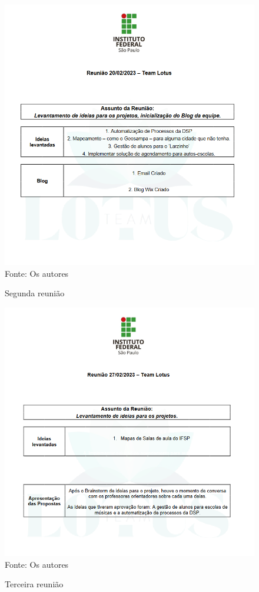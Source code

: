 \documentclass[12pt,a4paper]{article}
\begin{document}
\begin{figure}[H]
    \centering
    \caption{Segunda reunião}
     \includegraphics[width=15cm]{ilus2.png}
     Fonte: Os autores
     \label{fig08}
\end{figure}

\begin{figure}[H]
    \centering
    \caption{Terceira reunião}
     \includegraphics[width=15cm]{ilus3.png}
     Fonte: Os autores
     \label{fig09}
\end{figure}
\end{document}
